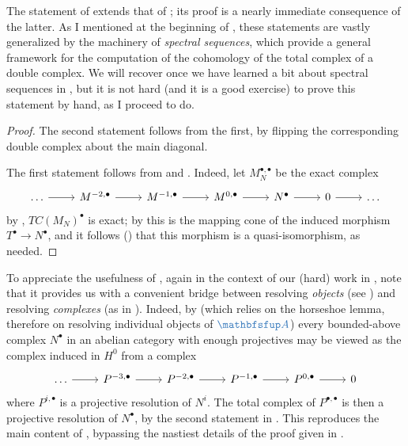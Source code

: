 The statement of  extends that of
; its proof is a nearly immediate
consequence of the latter. As I mentioned at the beginning of
, these
statements are vastly generalized by the machinery of \emph{spectral
  sequences}, which provide a general framework for the computation of
the cohomology of the total complex of a double complex. We will
recover  once we have learned a bit about
spectral sequences in , but
it is not hard (and it is a good exercise) to prove this statement by
hand, as I proceed to do.

\begin{proof}
  The second statement follows from the first, by flipping the
  corresponding double complex about the main diagonal.

  The first statement follows from  and
  . Indeed, let
  $M_N^{\bullet,\bullet}$ be the exact complex
  \[\begin{tikzcd}
      \dots \arrow[r] & M^{-2,\bullet} \arrow[r] & M^{-1,\bullet}
      \arrow[r] & M^{0,\bullet} \arrow[r] & N^\bullet \arrow[r] & 0
      \arrow[r] & \dots
    \end{tikzcd}\] by , $TC(M_N)^\bullet$
  is exact; by  this is the mapping
  cone of the induced morphism $T^\bullet \to N^\bullet$, and it
  follows () that this morphism is a
  quasi-isomorphism, as needed.
\end{proof}

To appreciate the usefulness of , again in
the context of our (hard) work in
,
note that it provides us with a convenient bridge between resolving
\emph{objects} (see ) and resolving
\emph{complexes} (as in ).  Indeed, by
 (which relies on the horseshoe lemma, therefore
on resolving individual objects of $\categ{A}$) every bounded-above
complex $N^\bullet$ in an abelian category with enough projectives may
be viewed as the complex induced in $H^0$ from a complex
\[\begin{tikzcd}
    \dots \arrow[r] & P^{-3,\bullet} \arrow[r] & P^{-2,\bullet}
    \arrow[r] & P^{-1,\bullet} \arrow[r] & P^{0,\bullet} \arrow[r] & 0
  \end{tikzcd}\] where $P^{i,\bullet}$ is a projective resolution of
$N^i$. The total complex of $P^{\bullet,\bullet}$ is then a projective
resolution of $N^\bullet$, by the second statement in
. This reproduces the main content of
, bypassing the nastiest details of the proof
given in
.

